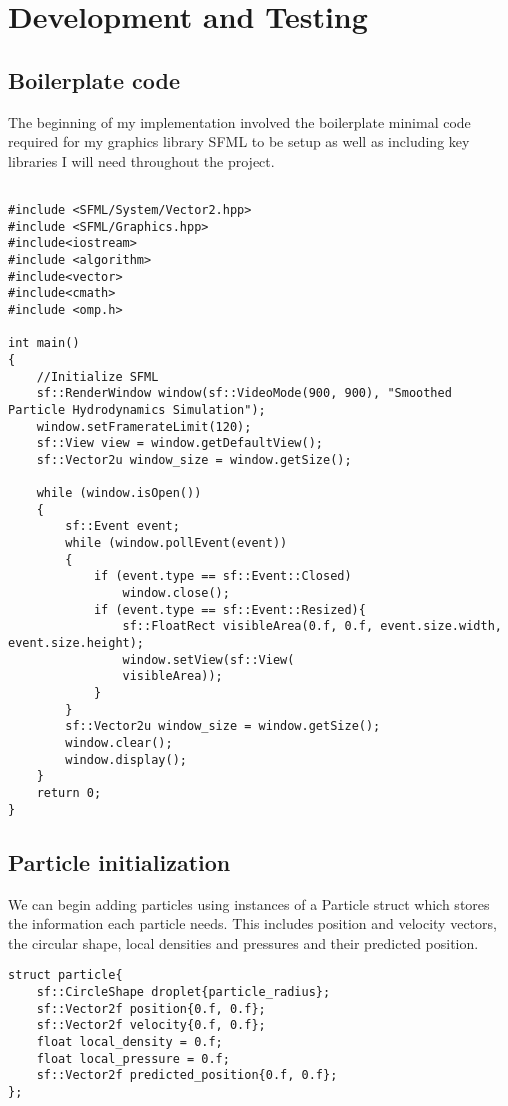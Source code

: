 \documentclass[write-up.tex]{subfiles}
\begin{document}
\section{Development and Testing}
\subsection{Boilerplate code}

The beginning of my implementation involved the boilerplate minimal code required for my graphics library SFML to be setup as well as including key libraries I will need throughout the project.
\begin{lstlisting}

#include <SFML/System/Vector2.hpp>
#include <SFML/Graphics.hpp>
#include<iostream>
#include <algorithm>
#include<vector>
#include<cmath>
#include <omp.h>

int main()
{
    //Initialize SFML
    sf::RenderWindow window(sf::VideoMode(900, 900), "Smoothed Particle Hydrodynamics Simulation");
    window.setFramerateLimit(120);
    sf::View view = window.getDefaultView();
    sf::Vector2u window_size = window.getSize();

    while (window.isOpen())
    {
        sf::Event event;
        while (window.pollEvent(event))
        {
            if (event.type == sf::Event::Closed)
                window.close();
            if (event.type == sf::Event::Resized){
                sf::FloatRect visibleArea(0.f, 0.f, event.size.width, event.size.height);
                window.setView(sf::View(
                visibleArea));
            }
        }
        sf::Vector2u window_size = window.getSize();
        window.clear();
        window.display();
    }
    return 0;
}
\end{lstlisting}

\subsection{Particle initialization}
We can begin adding particles using instances of a Particle struct which stores the information each particle needs. This includes position and velocity vectors, the circular shape, local densities and pressures and their predicted position.

\begin{lstlisting}
struct particle{
    sf::CircleShape droplet{particle_radius};
    sf::Vector2f position{0.f, 0.f};
    sf::Vector2f velocity{0.f, 0.f};
    float local_density = 0.f;
    float local_pressure = 0.f;
    sf::Vector2f predicted_position{0.f, 0.f};
};
\end{lstlisting}
\end{document}
